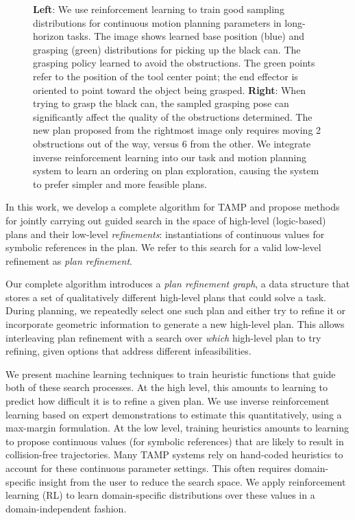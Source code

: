 \begin{figure}[t]
  \caption{\small{\textbf{Left}: We use reinforcement learning to train good sampling distributions for
      continuous motion planning parameters in long-horizon tasks.
      The image shows learned base position (blue) and
      grasping (green) distributions for picking up the black can. The grasping
      policy learned to avoid the obstructions. The green points refer
      to the position of the tool center point; the end effector is oriented
      to point toward the object being grasped. \textbf{Right}: When trying to grasp the black can, the sampled grasping pose can
      significantly affect the quality of the obstructions determined. The new plan proposed from the rightmost image only
      requires moving 2 obstructions out of the way, versus 6 from the other. We integrate inverse reinforcement learning into our task and
      motion planning system to learn an ordering on plan exploration, causing the system to prefer simpler and more feasible plans.}}
  \label{fig:cover}
\end{figure}

In this work, we develop a complete algorithm for TAMP and propose
methods for jointly carrying out guided search in the space of
high-level (logic-based) plans and their low-level
\emph{refinements}: instantiations of continuous values for
symbolic references in the plan. We refer to this search for a valid low-level
refinement as \emph{plan refinement}.

Our complete algorithm introduces
a \emph{plan refinement graph}, a data structure that stores a
set of qualitatively different high-level plans that could solve a task.
During planning, we repeatedly select one such plan and either try to
refine it or incorporate geometric information to generate a new high-level
plan. This allows interleaving plan refinement with a
search over \emph{which} high-level plan to try refining, given options
that address different infeasibilities.

We present machine learning techniques to train heuristic functions that guide
both of these search processes. At the high level, this amounts to learning
to predict how difficult it is to refine a given plan. We use inverse reinforcement learning
based on expert demonstrations to estimate this quantitatively, using a max-margin formulation.
At the low level, training heuristics amounts to
learning to propose continuous values (for symbolic references) that are likely to result in
collision-free trajectories. Many TAMP systems rely on hand-coded heuristics to
account for these continuous parameter settings. This often requires
domain-specific insight from the user to reduce the search space.
We apply reinforcement learning (RL) to learn domain-specific distributions
over these values in a domain-independent fashion.

